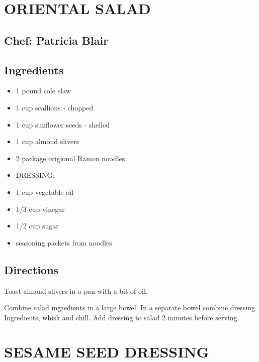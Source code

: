 \documentclass[
]{book}
\providecommand{\tightlist}{%
  \setlength{\itemsep}{0pt}\setlength{\parskip}{0pt}}
\begin{document}
\hypertarget{oriental-salad}{%
\section*{ORIENTAL SALAD}\label{oriental-salad}}


\hypertarget{chef-patricia-blair-6}{%
\subsection*{Chef: Patricia Blair}\label{chef-patricia-blair-6}}


\hypertarget{ingredients-22}{%
\subsection*{Ingredients}\label{ingredients-22}}


\begin{itemize}
\tightlist
\item
  1 pound cole slaw
\item
  1 cup scallions - chopped
\item
  1 cup sunflower seeds - shelled
\item
  1 cup almond slivers
\item
  2 package origional Ramon noodles
\item
  DRESSING:
\item
  1 cup vegetable oil
\item
  1/3 cup vinegar
\item
  1/2 cup sugar
\item
  seasoning packets from noodles
\end{itemize}

\hypertarget{directions-22}{%
\subsection*{Directions}\label{directions-22}}


Toast almond slivers in a pan with a bit of oil.

Combine salad ingredients in a large bowel. In a separate bowel combine dressing
Ingredients, whisk and chill. Add dressing to salad 2 minutes before serving

\hypertarget{sesame-seed-dressing}{%
\section*{SESAME SEED DRESSING}\label{sesame-seed-dressing}}
\end{document}
